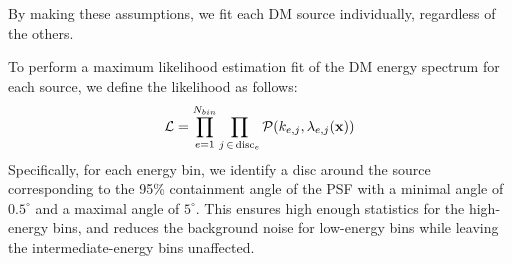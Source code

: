 \documentclass[12pt, a4paper]{article}
\newcommand{\red}[1]{\textcolor{red}{#1}}
\newcommand{\aure}[1]{\textcolor{orange}{[AA: #1]}}
\newcommand{\bx}{{\bf x}}
\begin{document}
By making these assumptions, we fit each DM source individually, regardless of the others. 

To perform a maximum likelihood estimation fit of the DM energy spectrum for each source, we define the likelihood as follows:
\begin{equation}
    \mathcal{L} = \prod_{e=1}^{N_{bin}} \prod_{j \, \in \, {\rm disc}_e}  
    \mathcal{P}(k_{e,j}, \lambda_{e,j}(\bx))
\end{equation}
Specifically, for each energy bin, we identify a disc around the source corresponding to the 95\% containment angle of the PSF with a minimal angle of $0.5^\circ$ and a maximal angle of $5^\circ$.
This ensures high enough statistics for the high-energy bins, and reduces the background noise for low-energy bins while leaving the intermediate-energy bins unaffected. 

\end{document}
